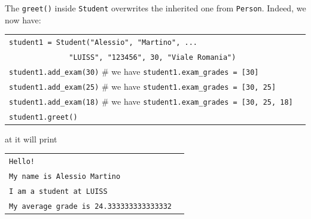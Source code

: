 \documentclass[t,handout,9pt]{beamer}
\begin{document}
\begin{frame}
\vfill
The \texttt{greet()} inside \texttt{Student} overwrites the inherited one from \texttt{Person}.
\vfill
Indeed, we now have:
\begin{table}[]
\begin{flushleft}
\begin{tabular}{ll}
\texttt{student1 = Student("Alessio", "Martino", ... } &  \\
\texttt{\ \ \ \ \ \ \ \ \ \ \ \ \ \ "LUISS", "123456", 30, "Viale Romania")} &  \\
\texttt{student1.add\_exam(30)} \qquad \# we have \texttt{student1.exam\_grades = [30]} &  \\
\texttt{student1.add\_exam(25)} \qquad \# we have \texttt{student1.exam\_grades = [30, 25]} &  \\
\texttt{student1.add\_exam(18)} \qquad \# we have \texttt{student1.exam\_grades = [30, 25, 18]} &  \\
\texttt{student1.greet()} &  \\
\end{tabular}
\end{flushleft}
\end{table}
at it will print
\begin{table}[]
\begin{flushleft}
\begin{tabular}{ll}
\texttt{Hello!} &  \\
\texttt{My name is Alessio Martino} &  \\
\texttt{I am a student at LUISS} &  \\
\texttt{My average grade is 24.333333333333332} &  \\
\end{tabular}
\end{flushleft}
\end{table}
\vfill
\end{frame}
%
\end{document}
